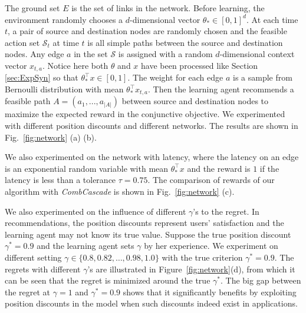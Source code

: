\documentclass{article}
\newcommand{\cS}{\mathcal{S}}
\begin{document}
The ground set $E$ is the set of links in the network. Before learning, the environment randomly chooses a $d$-dimensional vector $\theta_* \in [0,1]^d$. At each time $t$, a pair of source and destination nodes are randomly chosen and the feasible action set $\cS_t$ at time $t$ is all simple paths between the source and destination nodes. Any edge $a$ in the set $\cS$ is assigned with a random $d$-dimensional context vector $x_{t,a}$. Notice here both $\theta$ and $x$ have been processed like Section \ref{sec:ExpSyn} so that $\theta_*^{\top}x \in [0,1]$. The weight for each edge $a$ is a sample from Bernoulli distribution with mean $\theta_*^{\top}x_{t,a}$. Then the learning agent recommends a feasible path $A = (a_1,...,a_{|A|})$ between source and destination nodes to maximize the expected reward in the conjunctive objective. We experimented with different position discounts and different networks. The results are shown in Fig.~\ref{fig:network} (a) (b). 

We also experimented on the network with latency, where the latency on an edge is an exponential random variable with mean $\theta_{\ast}^{\top}x$ and the reward is $1$ if the latency is less than a tolerance $\tau = 0.75$. The comparison of rewards of our algorithm with {\it CombCascade} is shown in Fig.~\ref{fig:network} (c).

We also experimented on the influence of different $\gamma$'s to the regret. In recommendations, the position discounts represent users' satisfaction and the learning agent may not know its true value. Suppose the true position discount $\gamma^{\ast} = 0.9$ and the learning agent sets $\gamma$ by her experience. We experiment on different setting $\gamma \in \{0.8, 0.82, \ldots, 0.98, 1.0\}$ with the true criterion $\gamma^{\ast} = 0.9$. The regrets with different $\gamma$'s are illustrated in Figure~\ref{fig:network}(d), from which it can be seen that the regret is minimized around the true $\gamma^{\ast}$. The big gap between the regret at $\gamma = 1$ and $\gamma^{\ast} = 0.9$ shows that it significantly benefits by exploiting position discounts in the model when such discounts indeed exist in applications.



\end{document}
